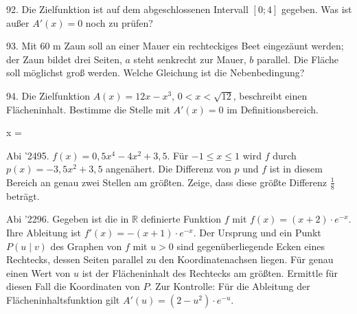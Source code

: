 \documentclass[11pt]{article}
\begin{document}
\begin{pfaufg}{}{92.}{}
Die Zielfunktion ist auf dem abgeschlossenen Intervall $[0; 4]$ gegeben. Was ist außer $A'(x) = 0$ noch zu prüfen?
\end{pfaufg}
\begin{pfaufg}{}{93.}{}
Mit 60 m Zaun soll an einer Mauer ein rechteckiges Beet eingezäunt werden; der Zaun bildet drei Seiten, $a$ steht senkrecht zur Mauer, $b$ parallel. Die Fläche soll möglichst groß werden. Welche Gleichung ist die Nebenbedingung?
\end{pfaufg}
\pfgruppe{}
\begin{pfaufg}{}{94.}{}
Die Zielfunktion $A(x) = 12x - x^3$, $0 < x < \sqrt{12}$, beschreibt einen Flächeninhalt. Bestimme die Stelle mit $A'(x) = 0$ im Definitionsbereich.
\par\noindent x = \leerfeld \par
{}
\end{pfaufg}
\pfgruppe{}
\begin{pfaufg}{Abi ’24}{95.}{}
$f(x) = 0{,}5x^4 - 4x^2 + 3{,}5$. Für $-1 \le x \le 1$ wird $f$ durch $p(x) = -3{,}5x^2 + 3{,}5$ angenähert. Die Differenz von $p$ und $f$ ist in diesem Bereich an genau zwei Stellen am größten. Zeige, dass diese größte Differenz $\tfrac{1}{8}$ beträgt.
\end{pfaufg}
\pfgruppe{}
\begin{pfaufg}{Abi ’22}{96.}{}
Gegeben ist die in $\mathbb{R}$ definierte Funktion $f$ mit $f(x) = (x + 2)\cdot e^{-x}$. Ihre Ableitung ist $f'(x) = -(x + 1)\cdot e^{-x}$. Der Ursprung und ein Punkt $P(u \mid v)$ des Graphen von $f$ mit $u > 0$ sind gegenüberliegende Ecken eines Rechtecks, dessen Seiten parallel zu den Koordinatenachsen liegen. Für genau einen Wert von $u$ ist der Flächeninhalt des Rechtecks am größten. Ermittle für diesen Fall die Koordinaten von $P$. Zur Kontrolle: Für die Ableitung der Flächeninhaltsfunktion gilt $A'(u) = (2 - u^2)\cdot e^{-u}$.
\end{pfaufg}
\end{document}
